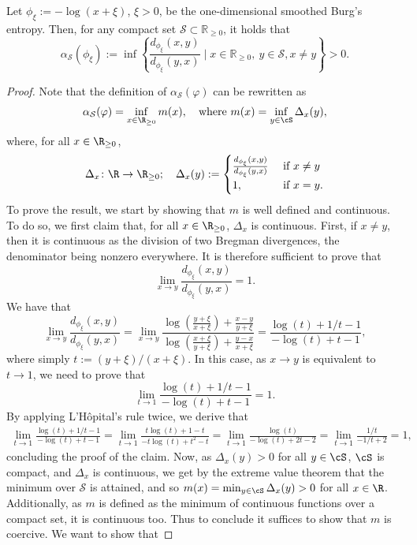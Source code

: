 \documentclass[11pt]{amsart}
\begin{document}
\begin{lemma} \label{thm: alpha(h)>0}
Let $\phi_\xi:=- \log(x+\xi)$, $\xi>0$, be the one-dimensional smoothed Burg's entropy. Then, for any compact set $\mathcal{S}\subset \mathbb{R}_{\geq 0}$, it holds that
\begin{equation}
\alpha_{\mathcal{S}}(\phi_\xi):=\inf \left\{\frac{d_{\phi_\xi} (x,y)}{d_{\phi_\xi}(y,x)} \mid x\in \mathbb{R}_{\geq 0}, \ y \in \mathcal{S}, x\neq y\right\} >0.
\end{equation}
\end{lemma}
\begin{proof}
Note that the definition of $\alpha_{\mathcal{S}}(\varphi)$ can be rewritten as
$$
\alpha_{\mathcal{S}}(\varphi)=\inf_{x\in\R_{\geq 0}} m(x), \quad \text{where } m(x)=\inf_{y\in \cS} \Delta_x(y),
$$
where, for all $x\in\R_{\geq 0}$,
$$
\Delta_x\colon \R\to \R_{\geq 0}; \quad \Delta_x(y):=
\begin{cases}
\frac{d_{\phi_\xi}(x, y)}{d_{\phi_\xi}(y, x)} & \text{ if } x\neq y\\
1, & \text{ if } x=y.
\end{cases}
$$
To prove the result, we start by showing that $m$ is well defined and continuous. To do so, we first claim that, for all $x\in \R_{\geq 0}$, $\Delta_x$ is continuous. First, if $x\neq y$, then it is continuous as the division of two Bregman divergences, the denominator being nonzero everywhere. It is therefore sufficient to prove that 
$$
\lim_{x\to y}\frac{d_{\phi_\xi}(x, y)}{d_{\phi_\xi}(y, x)}=1.
$$
We have that
$$
\lim_{x\to y}\frac{d_{\phi_\xi}(x, y)}{d_{\phi_\xi}(y, x)}=\lim_{x\to y}\frac{\log(\frac{y+\xi}{x+\xi})+\frac{x-y}{y+\xi}}{ \log(\frac{x+\xi}{y+\xi})+\frac{y-x}{x+\xi}}=\frac{\log(t)+1/t-1}{-\log(t)+t-1},
$$
where simply $t:=(y+\xi)/(x+\xi)$. In this case, as $x\to y$ is equivalent to $t\to 1$, we need to prove that
$$
\lim_{t\to 1}\frac{\log(t)+1/t-1}{-\log(t)+t-1}=1.
$$
By applying L'H\^opital's rule twice, we derive that
$$
\begin{aligned}
\lim_{t\to 1} \frac{\log(t)+1/t-1}{-\log(t)+t-1}=\lim_{t\to 1}\frac{t\log(t)+1-t}{-t\log(t)+t^2-t}= \lim_{t\to 1} \frac{\log(t)}{-\log(t)+2t-2}=\lim_{t\to 1} \frac{1/t}{-1/t+2}=1,
\end{aligned}
$$
concluding the proof of the claim. Now, as $\Delta_x(y)>0$ for all $y\in\cS$, $\cS$ is compact, and $\Delta_x$ is continuous, we get by the extreme value theorem that the minimum over $\mathcal{S}$ is attained, and so $m(x)=\min_{y\in \cS} \Delta_x(y)>0$ for all $x\in \R$. Additionally, as $m$ is defined as the minimum of continuous functions over a compact set, it is continuous too. Thus to conclude it suffices to show that $m$ is coercive. We want to show that 

\end{proof}
\end{document}
